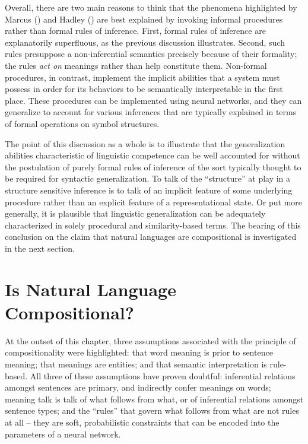 Overall, there are two main reasons to think that the phenomena highlighted by Marcus (\citeyear{Marcus:1998}) and Hadley (\citeyear{Hadley:2009}) are best explained by invoking informal procedures rather than formal rules of inference. First, formal rules of inference are explanatorily superfluous, as the previous discussion illustrates. Second, such rules presuppose a non-inferential semantics precisely because of their formality; the rules \textit{act on} meanings rather than help constitute them. Non-formal procedures, in contrast, implement the implicit abilities that a system must possess in order for its behaviors to be semantically interpretable in the first place. These procedures can be implemented using neural networks, and they can generalize to account for various inferences that are typically explained in terms of formal operations on symbol structures.

The point of this discussion as a whole is to illustrate that the generalization abilities characteristic of linguistic competence can be well accounted for without the postulation of purely formal rules of inference of the sort typically thought to be required for syntactic generalization. To talk of the ``structure'' at play in a structure sensitive inference is to talk of an implicit feature of some underlying procedure rather than an explicit feature of a representational state. Or put more generally, it is plausible that linguistic generalization can be adequately characterized in solely procedural and similarity-based terms. The bearing of this conclusion on the claim that natural languages are compositional is investigated in the next section.  

\section{Is Natural Language Compositional?}

At the outset of this chapter, three assumptions associated with the principle of compositionality were highlighted: that word meaning is prior to sentence meaning; that meanings are entities; and that semantic interpretation is rule-based. All three of these assumptions have proven doubtful: inferential relations amongst sentences are primary, and indirectly confer meanings on words; meaning talk is talk of what follows from what, or of inferential relations amongst sentence types; and the ``rules'' that govern what follows from what are not rules at all -- they are soft, probabilistic constraints that can be encoded into the parameters of a neural network. 

